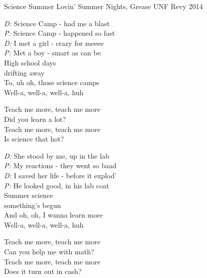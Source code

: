\begin{song}{Science Summer Lovin'}
  {} %
  {Summer Nights, Grease} %
  {} %
  {UNF Revy 2014} %
  {\NotCCLIed} %

  \begin{SBVerse}
    \emph{D:} Science Camp - had me a blast\\
    \emph{P:} Science Camp - happened so fast\\
    \emph{D:} I met a girl - crazy for meeee\\
    \emph{P:} Met a boy - smart as can be\\
    \medskip
    High school days\\
    drifting away\\
    To, uh oh, those science camps\\
    Well-a, well-a, well-a, huh
  \end{SBVerse}

  \begin{SBChorus}
    Teach me more, teach me more\\
    Did you learn a lot?\\
    Teach me more, teach me more\\
    Is science that hot?
  \end{SBChorus}

  \begin{SBVerse}
    \emph{D:} She stood by me, up in the lab\\
    \emph{P:} My reactions - they went so baad\\
    \emph{D:} I saved her life - before it explod'\\
    \emph{P:} He looked good, in his lab coat\\
    \medskip
    Summer science\\
    something's begun\\
    And oh, oh, I wanna learn more\\
    Well-a, well-a, well-a, huh
  \end{SBVerse}

  \begin{SBChorus}
    Teach me more, teach me more\\
    Can you help me with math?\\
    Teach me more, teach me more\\
    Does it turn out in cash?
  \end{SBChorus}


\end{song}
